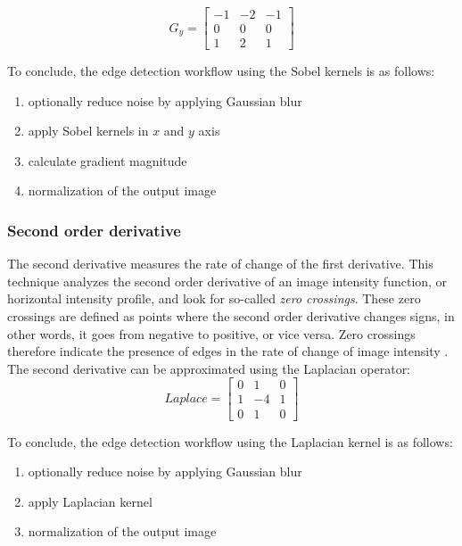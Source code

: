 \begin{equation}
	G_{y} =
	\begin{bmatrix}
		-1 & -2 & -1 \\
		0  & 0  & 0  \\
		1  & 2  & 1
	\end{bmatrix}
\end{equation}

\noindent
To conclude, the edge detection workflow using the Sobel kernels is as follows:
\begin{enumerate}
	\item optionally reduce noise by applying Gaussian blur
	\item apply Sobel kernels in $x$ and $y$ axis
	\item calculate gradient magnitude %
	\item normalization of the output image
\end{enumerate}

\subsubsection*{Second order derivative}
The second derivative measures the rate of change of the first derivative.
This technique analyzes the second order derivative of an image intensity function, or horizontal intensity profile,
and look for so-called \textit{zero crossings}.
These zero crossings are defined as points where the second order derivative changes signs,
in other words, it goes from negative to positive, or vice versa.
Zero crossings therefore indicate the presence of edges in the rate of change of image intensity \cite{gonzalezDigitalImageProcessing2007}.
The second derivative can be approximated using the Laplacian operator:
\begin{equation}
	Laplace =
	\begin{bmatrix}
		0 & 1  & 0 \\
		1 & -4 & 1 \\
		0 & 1  & 0
	\end{bmatrix}
\end{equation}

\noindent
To conclude, the edge detection workflow using the Laplacian kernel is as follows:
\begin{enumerate}
	\item optionally reduce noise by applying Gaussian blur
	\item apply Laplacian kernel
	\item normalization of the output image
\end{enumerate}

